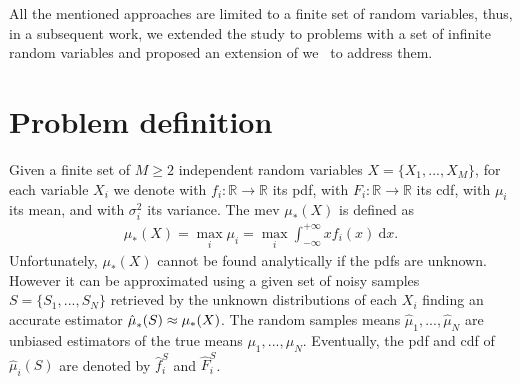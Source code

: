 All the mentioned approaches are limited to a finite set of random variables, thus, in a subsequent work, we extended the study to problems with a set of infinite random variables and proposed an extension of \gls{we}~\cite{deramo2017maximum} to address them.

\section{Problem definition}
Given a finite set of $M \geq 2$ independent random variables $X = \lbrace X_{1}, ..., X_{M} \rbrace$, for each variable $X_i$ we denote with $f_i : \mathbb{R} \rightarrow \mathbb{R}$ its \gls{pdf}, with $F_i : \mathbb{R} \rightarrow \mathbb{R}$ its \gls{cdf}, with $\mu_i$ its mean, and with $\sigma^2_i$ its variance.
The \gls{mev} $\mu_{*}(X)$ is defined as
\begin{align}\label{E:maxExp}
\mu_{*}(X) = \max_{i} \mu_{i} = \max_{i} \int_{-\infty}^{+\infty}xf_i(x)~\mathrm{d}x.
\end{align}
Unfortunately, $\mu_{*}(X)$ cannot be found analytically if the \glspl{pdf} are unknown.
However it can be approximated using a given set of noisy samples $S = \lbrace S_{1}, ..., S_{N} \rbrace$ retrieved by the unknown distributions of each $X_{i}$ finding an accurate estimator $\hat\mu_*^{}(S) \approx \mu_{*}(X)$. 
The random samples means $\hat{\mu}_{1}, ..., \hat{\mu}_{N}$ are unbiased estimators of the true means $\mu_{1}, ..., \mu_{N}$.
Eventually, the \gls{pdf} and \gls{cdf} of $\hat{\mu}_{i}(S)$ are denoted by $\hat f_i^S$ and $\hat F_i^S$.

